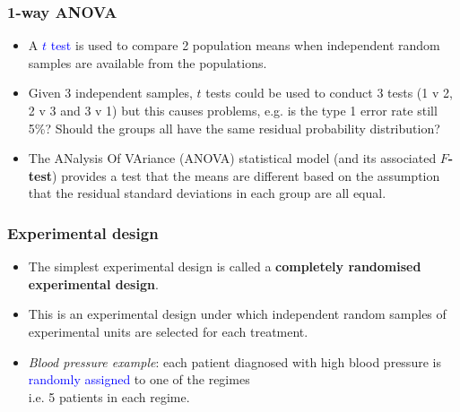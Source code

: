 \documentclass[12pt,xcolor=dvipsnames,handout,mathserif,aspectratio=169]{beamer}
\newcommand{\bbl}[1]{{\color{NavyBlue} \textbf{#1}}}
\newcommand{\bre}[1]{{\color{red} \textbf{#1}}}
\newcommand{\tc}{\textcolor}
\begin{document}
\begin{frame}
\frametitle{1-way ANOVA}
\begin{itemize}
\item  A \tc{blue}{$t$ test} is used to compare 2 population means when independent random samples are available from the populations.
\item Given 3 independent samples, $t$ tests could be used to conduct 3 tests (1 v 2, 2 v 3 and 3 v 1) but this causes problems, e.g. is the type 1 error rate still 5\%? Should the groups all have the same residual probability distribution?
\item The ANalysis Of VAriance (ANOVA) statistical model (and its associated \bbl{$F$-test}) provides a test that the means are different based on the assumption that the residual standard deviations in each group are all equal.
\end{itemize}
\end{frame}


\begin{frame}\frametitle{Experimental design}
\begin{itemize}
\item The simplest experimental design is called a \bre{completely randomised experimental design}.
\vspace{0.3cm}
\item This is an experimental design under which independent random samples of experimental units are selected for each treatment.
\vspace*{0.5cm}
\item \emph{Blood pressure example}: each patient diagnosed with high blood pressure is \tc{blue}{randomly assigned} to one of the regimes \\i.e. 5 patients in each regime.
\end{itemize}
\end{frame}
\end{document}
